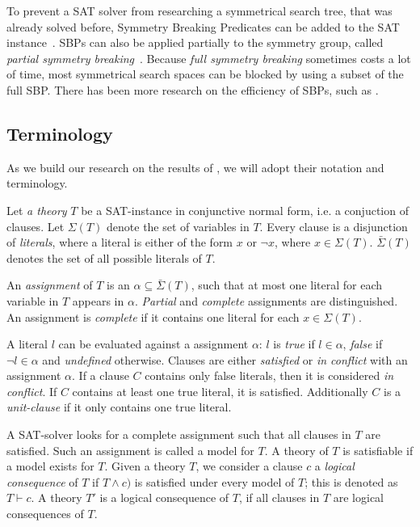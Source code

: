 To prevent a SAT solver from researching a symmetrical search tree, that was already solved
before, Symmetry Breaking Predicates can be added to the SAT
instance~\cite{sakallah2009symmetry}. SBPs can also be applied partially to the symmetry
group, called \textit{partial symmetry breaking}~\cite{sakallah2009symmetry}. Because
\textit{full symmetry breaking} sometimes costs a lot of time, most symmetrical search
spaces can be blocked by using a subset of the full SBP. There has been more research on
the efficiency of SBPs, such as \cite{aloul2006efficient}.

\subsection{Terminology}
	As we build our research on the results of \cite{devriendt2012symmetry}, we will adopt
	their notation and terminology.

	Let \emph{a theory} $T$ be a SAT-instance in conjunctive normal form, i.e. a conjuction
	of clauses.
	Let $\Sigma(T)$ denote the set of variables in $T$.
	Every clause is a disjunction of \emph{literals}, where a literal is either of the form
	$x$ or $\neg x$, where $x \in \Sigma(T)$.
	$\bar\Sigma(T)$ denotes the set of all possible literals of $T$.

	An \emph{assignment} of $T$ is an $\alpha \subseteq \bar\Sigma(T)$, such that at most
	one literal for each variable in $T$ appears in $\alpha$.
	\emph{Partial} and \emph{complete} assignments are distinguished.
	An assignment is \emph{complete} if it contains one literal for each $x \in \Sigma(T)$.

	A literal $l$ can be evaluated against a assignment $\alpha$: $l$ is \emph{true} if $l \in
	\alpha$, \emph{false} if $\neg l \in \alpha$ and \emph{undefined} otherwise.
	Clauses are either \emph{satisfied} or \emph{in conflict} with an assignment $\alpha$.
	If a clause $C$ contains only false literals, then it is considered \emph{in conflict}.
	If $C$ contains at least one true literal, it is satisfied.
	Additionally $C$ is a \emph{unit-clause} if it only contains one true literal.

	A SAT-solver looks for a complete assignment such that all clauses in $T$ are satisfied.
	Such an assignment is called a model for $T$.
	A theory of $T$ is satisfiable if a model exists for $T$.
	Given a theory $T$, we consider a clause $c$ a \emph{logical consequence} of $T$ if
	$T \wedge c)$ is satisfied under every model of $T$; this is denoted as $T \vdash c$.
	A theory $T'$ is a logical consequence of $T$, if all clauses in $T$ are logical
	consequences of $T$.

